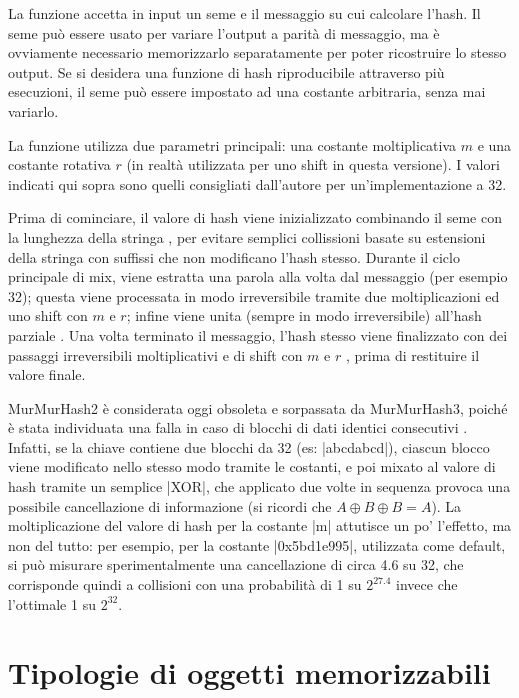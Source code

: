 La funzione accetta in input un seme e il messaggio su cui calcolare l'hash. Il seme può essere
usato per variare l'output a parità di messaggio, ma è ovviamente necessario memorizzarlo
separatamente per poter ricostruire lo stesso output. Se si desidera una funzione di hash
riproducibile attraverso più esecuzioni, il seme può essere impostato ad una costante arbitraria,
senza mai variarlo.

La funzione utilizza due parametri principali: una costante moltiplicativa $m$  e una
costante rotativa $r$  (in realtà utilizzata per uno shift in questa versione). I valori
indicati qui sopra sono quelli consigliati dall'autore per un'implementazione a \SI{32}{\bit}.

Prima di cominciare, il valore di hash viene inizializzato combinando il seme con la lunghezza della
stringa , per evitare semplici collissioni basate su estensioni della stringa con suffissi
che non modificano l'hash stesso. Durante il ciclo principale di mix, viene estratta una parola alla
volta dal messaggio (per esempio \SI{32}{\bit}); questa viene processata in modo irreversibile tramite due
moltiplicazioni ed uno shift con $m$ e $r$; infine viene unita (sempre in modo irreversibile)
all'hash parziale . Una volta terminato il messaggio, l'hash stesso viene finalizzato con
dei passaggi irreversibili moltiplicativi e di shift con $m$ e $r$ , prima di restituire il
valore finale.

MurMurHash2 è considerata oggi obsoleta e sorpassata da Mur\-Mur\-Hash3, poiché è stata individuata una
falla in caso di blocchi di dati identici consecutivi \cite{murmur2flaw}. Infatti, se la chiave
contiene due blocchi da \SI{32}{\bit} (es: \cverb|abcdabcd|), ciascun blocco viene modificato nello
stesso modo tramite le costanti, e poi mixato al valore di hash tramite un semplice \cverb|XOR|, che
applicato due volte in sequenza provoca una possibile cancellazione di informazione (si ricordi che
$A \oplus B \oplus B = A$). La moltiplicazione del valore di hash per la costante \cverb|m| attutisce
un po' l'effetto, ma non del tutto: per esempio, per la costante \cverb|0x5bd1e995|, utilizzata come
default, si può misurare sperimentalmente una cancellazione di circa \SI{4.6}{\bit} su \num{32}, che
corrisponde quindi a collisioni con una probabilità di \num{1} su $2 ^ {27.4}$ invece che l'ottimale
\num{1} su $2 ^ {32}$.

\section{Tipologie di oggetti memorizzabili}


